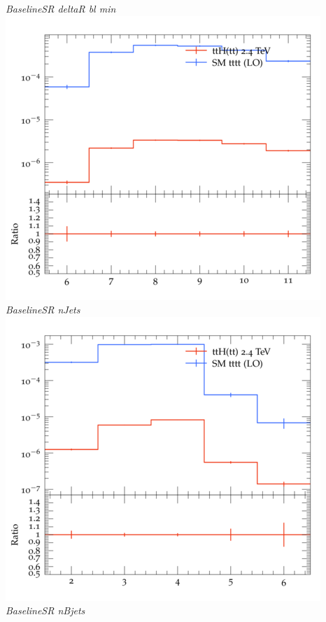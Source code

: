 \documentclass{beamer}
\begin{document}
\begin{frame}
\begin{columns}
\textit{\small BaselineSR deltaR bl min}
\includegraphics[width=\textwidth]{../plots/ttH_2400/tttt_ttH_1LOS/BaselineSR_nJets.png}\\
\textit{\small BaselineSR nJets}
\includegraphics[width=\textwidth]{../plots/ttH_2400/tttt_ttH_1LOS/BaselineSR_nBjets.png}\\
\textit{\small BaselineSR nBjets}
\end{columns}
\end{frame}
\end{document}
